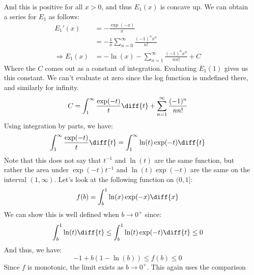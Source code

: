             And this is positive for all $x>0$, and thus
            $E_{1}(x)$ is concave up. We can obtain a series for
            $E_{1}$ as follows:
            \begin{align}
                E_{1}'(x)&=-\frac{\exp(-x)}{x}\\
                &=-\frac{1}{x}\sum_{n=0}^{\infty}
                    \frac{(-1)^{n}x^{n}}{n!}\\
                \Rightarrow
                E_{1}(x)&=-\ln(x)-\sum_{n=1}^{\infty}
                    \frac{(-1)^{n}x^{n}}{nn!}+C
            \end{align}
            Where the $C$ comes out as a constant of integration.
            Evaluating $E_{1}(1)$ gives us this constant.
            We can't evaluate at zero since the log function is
            undefined there, and similarly for infinity.
            \begin{equation}
                C=\int_{1}^{\infty}\frac{\exp(-t)}{t}\diff{t}
                +\sum_{n=1}^{\infty}\frac{(-1)^{n}}{nn!}
            \end{equation}
            Using integration by parts, we have:
            \begin{equation}
                \int_{1}^{\infty}\frac{\exp(-t)}{t}\diff{t}
                =\int_{1}^{\infty}\ln(t)\exp(-t)\diff{t}
            \end{equation}
            Note that this does not say that $t^{-1}$ and
            $\ln(t)$ are the same function, but rather the
            area under $\exp(-t)t^{-1}$ and $\ln(t)\exp(-t)$
            are the same on the interval $(1,\infty)$.
            Let's look at the following function on $(0,1]$:
            \begin{equation}
                f(b)=\int_{b}^{1}\ln(x)\exp(-x)\diff{x}
            \end{equation}
            We can show this is well defined when
            $b\rightarrow{0}^{+}$ since:
            \begin{equation}
                \int_{b}^{1}\ln(t)\diff{t}
                \leq\int_{b}^{1}\ln(t)\exp(-t)\diff{t}
                \leq{0}
            \end{equation}
            And thus, we have:
            \begin{equation}
                -1+b(1-\ln(b))\leq{f}(b)\leq{0}
            \end{equation}
            Since $f$ is monotonic, the limit exists as
            $b\rightarrow{0}^{+}$. This again uses the comparison
